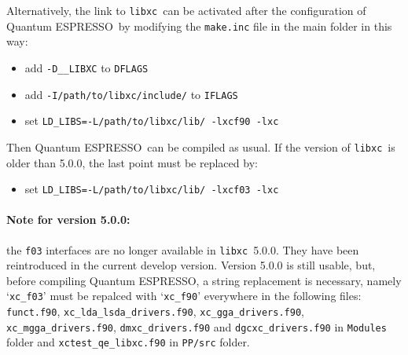 \documentclass[12pt,a4paper]{article}
\def\qe{{\sc Quantum ESPRESSO}}
\def\libxc{\texttt{libxc}}
\begin{document}
Alternatively, the link to \libxc\ can be activated after the configuration of  \qe\ by modifying the \texttt{make.inc} file in the main folder in this way:
\begin{itemize}
	\item add \texttt{-D\_\_LIBXC} to \texttt{DFLAGS}
	\item add \texttt{-I/path/to/libxc/include/} to \texttt{IFLAGS}
	\item set \texttt{LD\_LIBS=-L/path/to/libxc/lib/ -lxcf90 -lxc}
\end{itemize}
Then \qe\ can be compiled as usual. If the version of \libxc\ is older than 5.0.0, the last point must be replaced by:
\begin{itemize}
	\item set \texttt{LD\_LIBS=-L/path/to/libxc/lib/ -lxcf03 -lxc}
\end{itemize}
\paragraph{Note for version 5.0.0:} the \texttt{f03} interfaces are no longer available in \libxc\ 5.0.0. They have been reintroduced in the current develop version. Version 5.0.0 is still usable, but, before compiling \qe, a string replacement is necessary, namely `\texttt{xc\_f03}' must be repalced with `\texttt{xc\_f90}' everywhere in the following files: \texttt{funct.f90}, \texttt{xc\_lda\_lsda\_drivers.f90}, \texttt{xc\_gga\_drivers.f90}, \texttt{xc\_mgga\_drivers.f90}, \texttt{dmxc\_drivers.f90} and \texttt{dgcxc\_drivers.f90} in \texttt{Modules} folder and \texttt{xctest\_qe\_libxc.f90} in \texttt{PP/src} folder.
\end{document}
